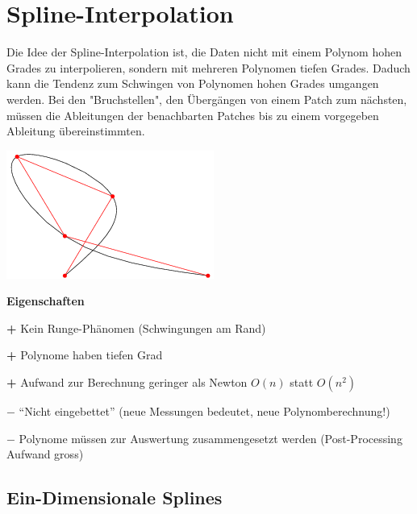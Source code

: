 \section{Spline-Interpolation}

\begin{minipage}[c]{14.5cm}
Die Idee der Spline-Interpolation ist, die Daten nicht mit einem Polynom hohen Grades zu interpolieren, sondern mit mehreren Polynomen tiefen Grades. Daduch kann die Tendenz  zum Schwingen von Polynomen hohen Grades umgangen werden. Bei den "Bruchstellen", den Übergängen von einem Patch zum nächsten, müssen die Ableitungen der benachbarten Patches bis zu einem vorgegeben Ableitung übereinstimmten.
\end{minipage}
\hfill
\begin{minipage}[c]{4cm}
\includegraphics[width=\textwidth]{bilder/kubikSpline}
\end{minipage}

\textbf{Eigenschaften}
\begin{liste}
  \item[\textbf{+}] Kein Runge-Phänomen (Schwingungen am Rand)
  \item[\textbf{+}] Polynome haben tiefen Grad
  \item[\textbf{+}] Aufwand zur Berechnung geringer als Newton $O(n)$ statt $O(n^2)$  
  \item[$\mathbf{-}$] "`Nicht eingebettet"' (neue Messungen bedeutet, neue Polynomberechnung!)
  \item[$\mathbf{-}$] Polynome müssen zur Auswertung zusammengesetzt werden (Post-Processing Aufwand gross)
\end{liste}


\subsection{Ein-Dimensionale Splines}
